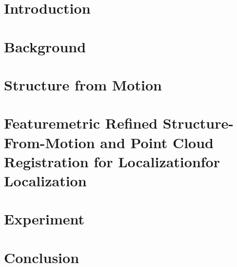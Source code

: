 \documentclass[11pt]{report}
\begin{document}
    
    \newpage

    

    \newpage
    \tableofcontents

    \newpage
    \chapter{Introduction}
    

    \newpage
    \chapter{Background}
    \label{chap:background}
    

    \newpage
    \chapter{Structure from Motion}
    \label{chap:sfm}
    

    \newpage
    \chapter{Featuremetric Refined Structure-From-Motion and Point Cloud Registration for Localizationfor Localization}
    \label{chap:method}
    

    \newpage
    \chapter{Experiment}
    \label{chap:experiment}
    

    \newpage
    \chapter{Conclusion}
    \label{chap:conclusion}
    

    
    
    
\end{document}
